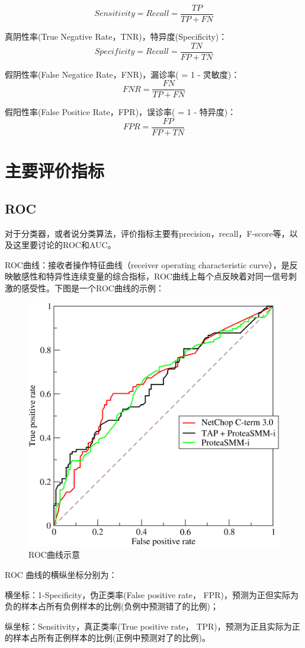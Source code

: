 \documentclass[12pt]{article}
\begin{document}
$$Sensitivity = Recall= \frac{TP}{TP+FN}$$

真阴性率(True Negative Rate，TNR)，特异度(Specificity)：
$$Specificity = Recall= \frac{TN}{FP+TN}$$

假阴性率(False Negatice Rate，FNR)，漏诊率( = 1 - 灵敏度)：
$$ FNR = \frac{FN}{TP+FN}$$

假阳性率(False Positice Rate，FPR)，误诊率( = 1 - 特异度)：
$$ FPR = \frac{FP}{FP+TN}$$

\section{主要评价指标 \cite{ROC-AUC}}
\subsection{ROC}
对于分类器，或者说分类算法，评价指标主要有precision，recall，F-score等，以及这里要讨论的ROC和AUC。

ROC曲线：接收者操作特征曲线（receiver operating characteristic curve），是反映敏感性和特异性连续变量的综合指标，ROC曲线上每个点反映着对同一信号刺激的感受性。下图是一个ROC曲线的示例：

\begin{figure}[ht]
  \centering
  \includegraphics[width=.5\textwidth]{fig/ROC_example.png} %
  \caption{ROC曲线示意} %
  \label{ROC_example} %
\end{figure}

ROC 曲线的横纵坐标分别为：

横坐标：1-Specificity，伪正类率(False positive rate， FPR)，预测为正但实际为负的样本占所有负例样本的比例(负例中预测错了的比例)；

纵坐标：Sensitivity，真正类率(True positive rate， TPR)，预测为正且实际为正的样本占所有正例样本的比例(正例中预测对了的比例)。
\end{document}
